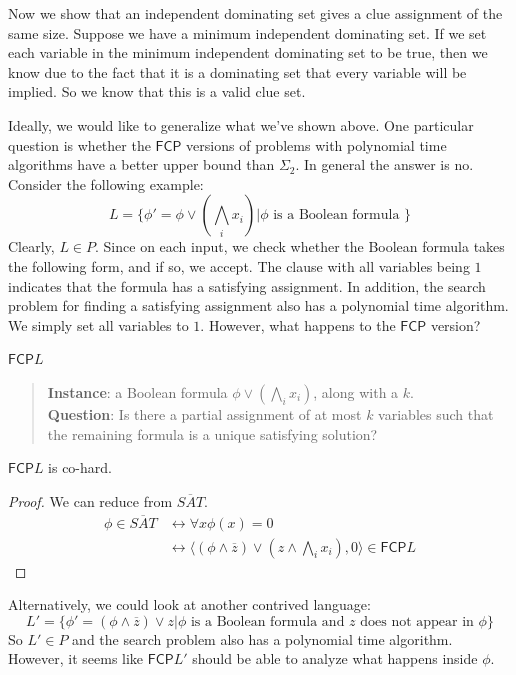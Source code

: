 \documentclass[runningheads,a4paper]{llncs}
\begin{document}
Now we show that an independent dominating set gives a clue assignment of the same size. Suppose we have a minimum independent dominating set. If we set each variable in the minimum independent dominating set to be true, then we know due to the fact that it is a dominating set that every variable will be implied. So we know that this is a valid clue set.

Ideally, we would like to generalize what we've shown above. One particular question is whether the $\mathsf{FCP}$ versions of problems with polynomial time algorithms have a better upper bound than $\Sigma_2$. In general the answer is no. Consider the following example:
\[ L = \{ \phi' = \phi \vee \left( \bigwedge_i x_i \right) | \phi \text{ is a Boolean formula }\} \]
Clearly, $L \in P$. Since on each input, we check whether the Boolean formula takes the following form, and if so, we accept. The clause with all variables being $1$ indicates that the formula has a satisfying assignment. In addition, the search problem for finding a satisfying assignment also has a polynomial time algorithm. We simply set all variables to $1$. However, what happens to the $\mathsf{FCP}$ version?

$\mathsf{FCP} L$ 
\begin{quote}
\textbf{Instance}: a Boolean formula $\phi \vee \left( \bigwedge_i x_i\right)$, along with a $k$.\\
\textbf{Question}: Is there a partial assignment of at most $k$ variables such that the remaining formula is a unique satisfying solution?
\end{quote}

\begin{proposition}
$\mathsf{FCP} L$ is co\NP-hard.
\end{proposition}

\begin{proof}
We can reduce from $\overline{SAT}$. 
\begin{align}
\phi \in \overline{SAT} &\leftrightarrow \forall x \phi(x) = 0 \\
				    & \leftrightarrow \langle (\phi \wedge \overline{z}) \vee \left(z \wedge \bigwedge_i x_i \right), 0 \rangle \in \mathsf{FCP} L
\end{align}
\end{proof}

Alternatively, we could look at another contrived language:
\[ L' = \{ \phi' = (\phi \wedge \overline{z}) \vee z | \phi \text{ is a Boolean formula and $z$ does not appear in $\phi$} \} \]
So $L' \in P$ and the search problem also has a polynomial time algorithm. However, it seems like $\mathsf{FCP} L'$ should be able to analyze what happens inside $\phi$. 
\end{document}

